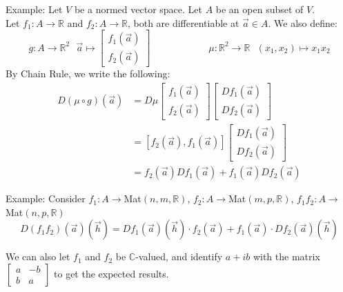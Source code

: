 \documentclass[15pt]{book}
\theoremstyle{break}
\theoremstyle{break}
\newcommand{\R}{\mathbb{R}}
\newcommand{\Complex}{\mathbb{C}}
\newcommand{\example}{\color{green}Example: \color{black}}
\begin{document}
\example Let $V$ be a normed vector space. Let $A$ be an open subset of $V$.\\ Let $f_1:A \to \R$ and $f_2: A \to \R$, both are differentiable at $\vec{a}\in A$. We also define:
$$g:A \to \R^2 \ \ \ \vec{a}\mapsto \begin{bmatrix}
f_1(\vec{a}) \\ f_2(\vec{a})
\end{bmatrix} \qquad\qquad\qquad \mu:\R^2 \to \R\ \ \ (x_1,x_2)\mapsto x_1x_2$$
By Chain Rule, we write the following:
\begin{align*}
D(\mu\circ g)(\vec{a})
&=D\mu \begin{bmatrix}
f_1(\vec{a}) \\ f_2(\vec{a})
\end{bmatrix} \begin{bmatrix}
Df_1(\vec{a})\\ Df_2(\vec{a})
\end{bmatrix} \\
&=[f_2(\vec{a}),f_1(\vec{a})]\begin{bmatrix}
Df_1(\vec{a})\\ Df_2(\vec{a})
\end{bmatrix} \\
&= f_2(\vec{a})Df_1(\vec{a})+f_1(\vec{a})Df_2(\vec{a})
\end{align*}

\example Consider $f_1:A \to $Mat$(n,m,\R)$, $f_2:A \to$Mat$(m,p,\R)$, $f_1f_2:A \to$Mat$(n,p,\R)$\\
$$D(f_1f_2)(\vec{a})(\vec{h}) = Df_1(\vec{a})(\vec{h})\cdot f_2(\vec{a})+f_1(\vec{a})\cdot Df_2(\vec{a})(\vec{h})$$

We can also let $f_1$ and $f_2$ be $\Complex$-valued, and identify $a+ib$ with the matrix
$\begin{bmatrix} a & -b \\ b & a \end{bmatrix}$ to get the expected results. 


























\newpage
\end{document}
